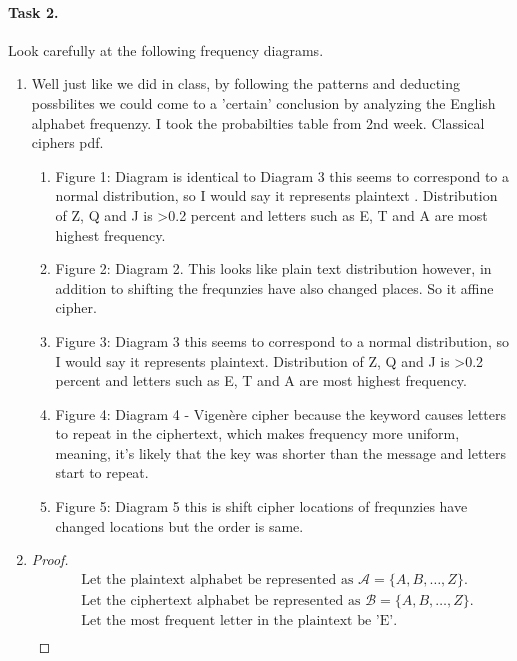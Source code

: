 \documentclass{article}
\begin{document}
\paragraph{Task 2.} Look carefully at the following frequency diagrams.
\begin{enumerate}
    \item Well just like we did in class, by following the patterns and deducting possbilites we could come to a 'certain' conclusion by
    analyzing the English alphabet frequenzy. I took the probabilties table from 2nd week. Classical ciphers pdf.
    \begin{enumerate}
            \item Figure 1: Diagram is identical to Diagram 3 this seems to correspond to a normal distribution, so I would say it
            represents plaintext . Distribution
            of Z, Q and J is >0.2 percent and letters such as E, T and A are most highest frequency.
            \item Figure 2: Diagram 2. This looks like plain text distribution however, in addition to shifting the frequnzies have also
            changed places. So it affine cipher.
      \item Figure 3: Diagram 3 this seems to correspond to a normal distribution, so I would say it represents plaintext. Distribution
            of Z, Q and J is >0.2 percent and letters such as E, T and A are most highest frequency.
      \item Figure 4: Diagram 4 -  Vigenère cipher because the keyword causes letters to repeat in the ciphertext, which makes frequency
            more uniform, meaning, it's likely that the key was shorter than the message and letters start to repeat.
      \item Figure 5: Diagram 5 this is shift cipher locations of
            frequnzies have changed locations but the order is same.
    \end{enumerate}
    \item
    \begin{minipage}{\linewidth}
          \begin{proof}
            \begin{align*}
              &\text{Let the plaintext alphabet be represented as } \mathcal{A} = \{A, B, \ldots, Z\}. \\
              &\text{Let the ciphertext alphabet be represented as } \mathcal{B} = \{A, B, \ldots, Z\}. \\
              &\text{Let the most frequent letter in the plaintext be 'E'.} \\

\end{align*}
\end{proof}
\end{minipage}
\end{enumerate}
\end{document}
